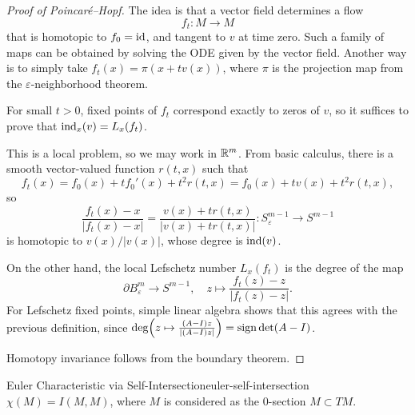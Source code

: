 \begin{proof}[Proof of Poincar\'e--Hopf]
    The idea is that a vector field determines a flow
    \[
        f_t \colon M \to M
    \]
    that is homotopic to $f_0 = \mathrm{id}$, and tangent to $v$ at time zero. Such a family of maps can be obtained by solving the ODE given by the vector field. Another way is to simply take $f_t(x) = \pi(x + t v(x))$, where $\pi$ is the projection map from the $\varepsilon$-neighborhood theorem.

    For small $t > 0$, fixed points of $f_t$ correspond exactly to zeros of $v$, so it suffices to prove that $\operatorname{ind}_x(v) = L_x(f_t)$.

    This is a local problem, so we may work in $\mathbb{R}^m$. From basic calculus, there is a smooth vector-valued function $r(t, x)$ such that
    \[
        f_t(x) = f_0(x) + t f_0'(x) + t^2 r(t, x) = f_0(x) + t v(x) + t^2 r(t, x),
    \]
    so
    \[
        \frac{f_t(x) - x}{|f_t(x) - x|} = \frac{v(x) + t r(t, x)}{|v(x) + t r(t, x)|} \colon S_\varepsilon^{m-1} \to S^{m-1}
    \]
    is homotopic to $v(x)/|v(x)|$, whose degree is $\operatorname{ind}(v)$.

    On the other hand, the local Lefschetz number $L_x(f_t)$ is the degree of the map
    \[
        \partial B_\varepsilon^m \to S^{m-1}, \quad z \mapsto \frac{f_t(z) - z}{|f_t(z) - z|}.
    \]
    For Lefschetz fixed points, simple linear algebra shows that this agrees with the previous definition, since $\deg\!\left(z \mapsto \frac{(A - I)z}{|(A - I)z|}\right) = \operatorname{sign} \det(A - I)$.

    Homotopy invariance follows from the boundary theorem.
\end{proof}

\begin{corollary}{Euler Characteristic via Self-Intersection}{euler-self-intersection}
    $\chi(M) = I(M, M)$, where $M$ is considered as the $0$-section $M \subset TM$.
\end{corollary}
